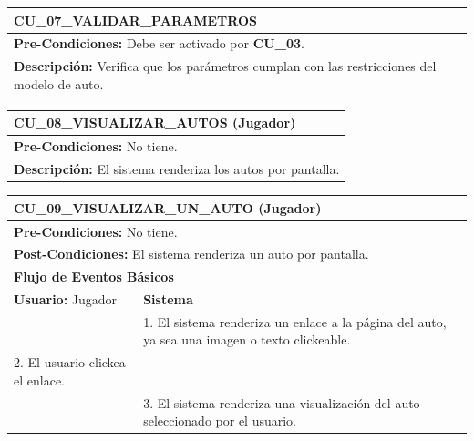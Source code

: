\begin{center}
  \begin{tabular}{| p{7.5cm} | p{7.5cm} |}
    \hline
    \multicolumn{2}{|p{15cm}|}{\textbf{CU\_07\_VALIDAR\_PARAMETROS}} \\ \hline
    \multicolumn{2}{|p{15cm}|}{\textbf{Pre-Condiciones:} Debe ser activado por \textbf{CU\_03}.} \\ \hline
    \multicolumn{2}{|p{15cm}|}{\textbf{Descripción:} Verifica que los parámetros cumplan con las restricciones del modelo de auto.} \\
    \hline
  \end{tabular}
\end{center}

\begin{center}
  \begin{tabular}{| p{7.5cm} | p{7.5cm} |}
    \hline
    \multicolumn{2}{|p{15cm}|}{\textbf{CU\_08\_VISUALIZAR\_AUTOS} (Jugador)} \\ \hline
    \multicolumn{2}{|p{15cm}|}{\textbf{Pre-Condiciones:} No tiene.} \\ \hline
    \multicolumn{2}{|p{15cm}|}{\textbf{Descripción:} El sistema renderiza los autos por pantalla.} \\
    \hline
  \end{tabular}
\end{center}

\begin{center}
  \begin{tabular}{| p{7.5cm} | p{7.5cm} |}
    \hline
    \multicolumn{2}{|p{15cm}|}{\textbf{CU\_09\_VISUALIZAR\_UN\_AUTO} (Jugador)} \\ \hline
    \multicolumn{2}{|p{15cm}|}{\textbf{Pre-Condiciones:} No tiene.} \\ \hline
    \multicolumn{2}{|p{15cm}|}{\textbf{Post-Condiciones:} El sistema renderiza un auto por pantalla.} \\ \hline
    \multicolumn{2}{|p{7.5cm}|}{\textbf{Flujo de Eventos Básicos}} \\ \hline
    \multicolumn{1}{|p{7.5cm}|}{\textbf{Usuario:} Jugador} & \multicolumn{1}{|p{7.5cm}|}{\textbf{Sistema}} \\ \hline
    
    \multicolumn{1}{|p{7.5cm}|}{} & 
    \multicolumn{1}{|p{7.5cm}|}{1. El sistema renderiza un enlace a la página del auto, ya sea una imagen o texto clickeable.}\\ \hline
    
    \multicolumn{1}{|p{7.5cm}|}{2. El usuario clickea el enlace.}& 
    \multicolumn{1}{|p{7.5cm}|}{}\\ \hline
    
    \multicolumn{1}{|p{7.5cm}|}{} & 
    \multicolumn{1}{|p{7.5cm}|}{3. El sistema renderiza una visualización del auto seleccionado por el usuario.}\\ \hline
  \end{tabular}
\end{center}

